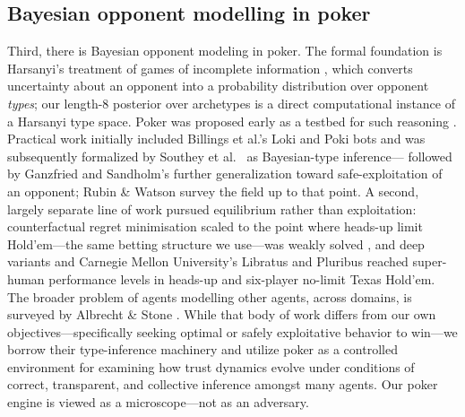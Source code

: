 \documentclass[10pt,twocolumn,letterpaper]{article}
\begin{document}
\subsection{Bayesian opponent modelling in poker}
Third, there is Bayesian opponent modeling in poker. The formal
foundation is Harsanyi's treatment of games of incomplete
information \citep{harsanyi1967games}, which converts uncertainty
about an opponent into a probability distribution over opponent
\emph{types}; our length-8 posterior over archetypes is a direct
computational instance of a Harsanyi type space. Poker was proposed
early as a testbed for such reasoning \citep{billings2002challenge}.
Practical work initially
included Billings et al.'s Loki and Poki bots
\citep{billings1998opponent} and was subsequently formalized by Southey
et al.\ \citep{southey2005bayes} as Bayesian-type inference---
followed by Ganzfried and Sandholm's \citep{ganzfried2015safe}
further generalization toward safe-exploitation of an opponent; Rubin
\& Watson \citep{rubin2011computer} survey the field up to that
point. A second, largely separate line of work pursued equilibrium
rather than exploitation: counterfactual regret minimisation
\citep{zinkevich2007regret} scaled to the point where heads-up limit
Hold'em---the same betting structure we use---was weakly solved
\citep{bowling2015heads}, and deep variants
\citep{moravcik2017deepstack} and Carnegie Mellon University's
Libratus and Pluribus
\citep{brown2018superhuman,brown2019superhuman} reached super-human
performance levels in heads-up and six-player no-limit Texas
Hold'em. The broader problem of agents modelling other agents,
across domains, is surveyed by Albrecht \& Stone
\citep{albrecht2018autonomous}. While that body of work differs from our own
objectives---specifically seeking optimal or safely exploitative
behavior to win---we borrow their type-inference machinery and
utilize poker as a controlled environment for examining how trust
dynamics evolve under conditions of correct, transparent, and
collective inference amongst many agents. Our poker engine is viewed
as a microscope---not as an adversary.
\end{document}
